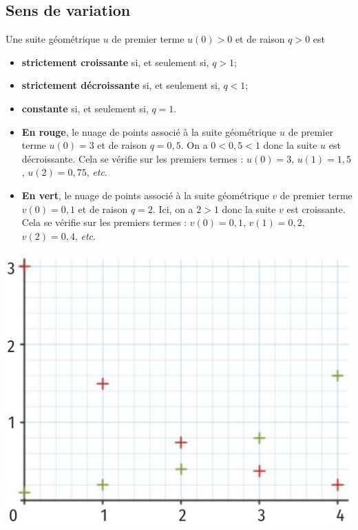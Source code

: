 \documentclass[11pt]{article}
\begin{document}
\subsection{Sens de variation}
\begin{prop}
  Une suite géométrique $u$ de premier terme $u(0)>0$ et de raison $q>0$ est
  \begin{itemize}
    \item \textbf{strictement croissante} si, et seulement si, $q>1$;
    \item \textbf{strictement décroissante} si, et seulement si, $q<1$;
    \item \textbf{constante} si, et seulement si, $q=1$.
  \end{itemize}
\end{prop}

\begin{exemple}
  \begin{minipage}{.4\textwidth}
    \begin{itemize}
      \item \textcolor{red!80!black}{\textbf{En rouge}}, le nuage de points associé à la
    suite géométrique $u$ de premier terme $u(0)=3$ et de raison $q=0,5$. On a
    $0<0,5<1$ donc la suite $u$ est décroissante. Cela se vérifie sur les
    premiers termes : $u(0)=3$, $u(1)=1,5$, $u(2)=0,75$, \emph{etc}.
  \item \textcolor{green!50!black}{\textbf{En vert}}, le nuage de points associé
    à la suite géométrique $v$ de premier terme $v(0)=0,1$ et de raison $q=2$.
    Ici, on a $2>1$ donc la suite $v$ est croissante. Cela se vérifie sur les
    premiers termes : $v(0)=0,1$, $v(1)=0,2$, $v(2)=0,4$, \emph{etc}.
    \end{itemize}
  \end{minipage}
  \begin{minipage}{.6\textwidth}
    \begin{center}
\includegraphics[scale=.25]{variations.png}
    \end{center}
  \end{minipage}
\end{exemple}
\end{document}

